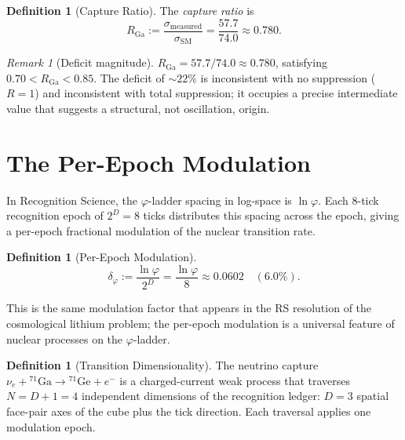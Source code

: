 \documentclass[12pt,a4paper]{article}
\theoremstyle{definition}
\newtheorem{definition}[theorem]{Definition}
\theoremstyle{remark}
\newtheorem{remark}[theorem]{Remark}
\begin{document}
\begin{definition}[Capture Ratio]
The \emph{capture ratio} is
\begin{equation}
  R_{\mathrm{Ga}} := \frac{\sigma_{\mathrm{measured}}}{\sigma_{\mathrm{SM}}}
  = \frac{57.7}{74.0} \approx 0.780.
\end{equation}
\end{definition}

\begin{remark}[Deficit magnitude]
\label{rem:deficit-magnitude}
$R_{\mathrm{Ga}} = 57.7/74.0 \approx 0.780$, satisfying
$0.70 < R_{\mathrm{Ga}} < 0.85$.  The deficit of $\sim\!22\%$ is
inconsistent with no suppression ($R=1$) and inconsistent with
total suppression; it occupies a precise intermediate value that
suggests a structural, not oscillation, origin.
\end{remark}

\section{The Per-Epoch Modulation}
\label{sec:modulation}

In Recognition Science, the $\varphi$-ladder spacing in log-space is
$\ln\varphi$.  Each 8-tick recognition epoch of $2^D = 8$ ticks
distributes this spacing across the epoch, giving a per-epoch
fractional modulation of the nuclear transition rate.

\begin{definition}[Per-Epoch Modulation]
\begin{equation}
  \delta_\varphi := \frac{\ln\varphi}{2^D}
  = \frac{\ln\varphi}{8} \approx 0.0602 \quad (6.0\%).
\end{equation}
\end{definition}

This is the same modulation factor that appears in the RS resolution of
the cosmological lithium problem; the per-epoch modulation is a
universal feature of nuclear processes on the $\varphi$-ladder.

\begin{definition}[Transition Dimensionality]
The neutrino capture $\nu_e + {}^{71}\mathrm{Ga} \to
{}^{71}\mathrm{Ge} + e^-$ is a charged-current weak process that
traverses $N = D + 1 = 4$ independent dimensions of the recognition
ledger: $D = 3$ spatial face-pair axes of the cube plus the tick
direction.  Each traversal applies one modulation epoch.
\end{definition}
\end{document}

